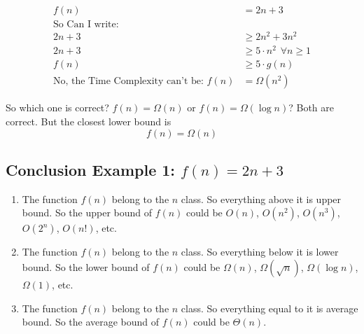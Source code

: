 \documentclass{article}
\begin{document}
\[
\begin{aligned}
    f(n) &= 2n + 3 \\
    \text{So Can I write: }\\
        2n+3 &\geq 2n^2 + 3n^2\\ 
        2n+3 &\geq 5\cdot n^2 \hspace{5pt} \forall n \geq 1 \\
        f(n) &\geq 5 \cdot g(n) \\
        \text{No, the Time Complexity can't be: } f(n) &= \Omega(n^2)
\end{aligned}
\]

So which one is correct? $f(n) = \Omega(n)$ or $f(n) = \Omega(\log{n})$? Both are correct. But the closest lower bound is 
\[
\boxed{f(n) = \Omega(n)}
\]

\subsection{Conclusion Example 1: $f(n) = 2n + 3$}
\begin{enumerate}
    \item The function $f(n)$ belong to the $n$ class. So everything above it is upper bound. So the upper bound of $f(n)$ could be $O(n)$, $O(n^2)$, $O(n^3)$, $O(2^n)$, $O(n!)$, etc.

    \item The function $f(n)$ belong to the $n$ class. So everything below it is lower bound. So the lower bound of $f(n)$ could be $\Omega(n)$, $\Omega(\sqrt{n})$, $\Omega(\log{n})$, $\Omega(1)$, etc.

    \item The function $f(n)$ belong to the $n$ class. So everything equal to it is average bound. So the average bound of $f(n)$ could be $\Theta(n)$.
\end{enumerate}
\end{document}
